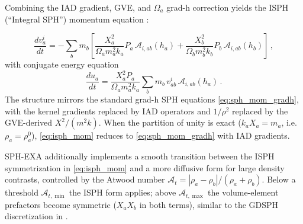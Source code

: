 
Combining the IAD gradient, GVE, and $\Omega_a$ grad-h correction yields the ISPH (``Integral SPH'') momentum equation \cite{GarciaSenz2022}:

\begin{equation}
    \frac{dv^i_a}{dt} = -\sum_b m_b \left[\frac{X_a^2}{\Omega_a m_a^2 k_a} P_a \, \mathcal{A}_{i,ab}(h_a) + \frac{X_b^2}{\Omega_b m_b^2 k_b} P_b \, \mathcal{A}_{i,ab}(h_b) \right]\,,
    \label{eq:isph_mom}
\end{equation}
with conjugate energy equation
\begin{equation}
    \frac{du_a}{dt} = \frac{X_a^2 P_a}{\Omega_a m_a^2 k_a} \sum_b m_b \, v^i_{ab} \, \mathcal{A}_{i,ab}(h_a)\,.
    \label{eq:isph_energy}
\end{equation}
The structure mirrors the standard grad-h SPH equations \eqref{eq:sph_mom_gradh}, with the kernel gradients replaced by IAD operators and $1/\rho^2$ replaced by the GVE-derived $X^2/(m^2 k)$. When the partition of unity is exact ($k_a X_a = m_a$, i.e.\ $\rho_a = \rho_a^0$), \eqref{eq:isph_mom} reduces to \eqref{eq:sph_mom_gradh} with IAD gradients. %

SPH-EXA additionally implements a smooth transition between the ISPH symmetrization in \eqref{eq:isph_mom} and a more diffusive form for large density contrasts, controlled by the Atwood number $\mathcal{A}_t = |\rho_a - \rho_b|/(\rho_a + \rho_b)$. Below a threshold $\mathcal{A}_{t,\min}$ the ISPH form applies; above $\mathcal{A}_{t,\max}$ the volume-element prefactors become symmetric ($X_a X_b$ in both terms), similar to the GDSPH discretization in \cite{WissingShen2020}.


